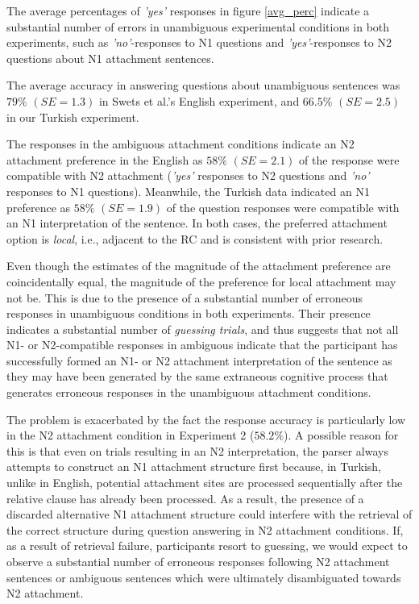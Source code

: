 \documentclass[11pt]{article}\usepackage[]{graphicx}\usepackage[]{color}
\begin{document}
The average percentages of \textit{'yes'} responses in figure \ref{avg_perc} indicate a substantial number of errors in unambiguous experimental conditions in both experiments, such as \textit{'no'}-responses to N1 questions and \textit{'yes'}-responses to N2 questions about N1 attachment sentences.

The average accuracy in answering questions about unambiguous sentences was $79\%$ $(SE=1.3)$
in Swets et al.'s English experiment, and $66.5\%$ $(SE=2.5)$
in our Turkish experiment.

The responses in the ambiguous attachment conditions indicate an N2 attachment preference in the English as $58\%$ $(SE=2.1)$ of the response were compatible with N2 attachment (\textit{'yes'} responses to N2 questions and \textit{'no'} responses to N1 questions). Meanwhile, the Turkish data indicated an N1 preference as $58\%$ $(SE=1.9)$ of the question responses were compatible with an N1 interpretation of the sentence. In both cases, the preferred attachment option is \textit{local}, i.e., adjacent to the RC and is consistent with prior research.

%
Even though the estimates of the magnitude of the attachment preference are coincidentally equal, the magnitude of the preference for local attachment may not be. This is due to the presence of a substantial number of erroneous responses in unambiguous conditions in both experiments. Their presence indicates a substantial number of \textit{guessing trials}, and thus suggests that not all N1- or N2-compatible responses in ambiguous indicate that the participant has successfully formed an N1- or N2 attachment interpretation of the sentence as they may have been generated by the same extraneous cognitive process that generates erroneous responses in the unambiguous attachment conditions.

The problem is exacerbated by the fact the response accuracy is particularly low in the N2 attachment condition in Experiment 2 ($58.2\%$). A possible reason for this is that even on trials resulting in an N2 interpretation, the parser always attempts to construct an N1 attachment structure first because, in Turkish, unlike in English, potential attachment sites are processed sequentially after the relative clause has already been processed. 
As a result, the presence of a discarded alternative N1 attachment structure \citep[e.g.,][]{Staub:2007} could interfere with the retrieval of the correct structure during question answering in N2 attachment conditions.
If, as a result of retrieval failure, participants resort to guessing, we would expect to observe a substantial number of erroneous responses following N2 attachment sentences or ambiguous sentences which were ultimately disambiguated towards N2 attachment.
\end{document}
